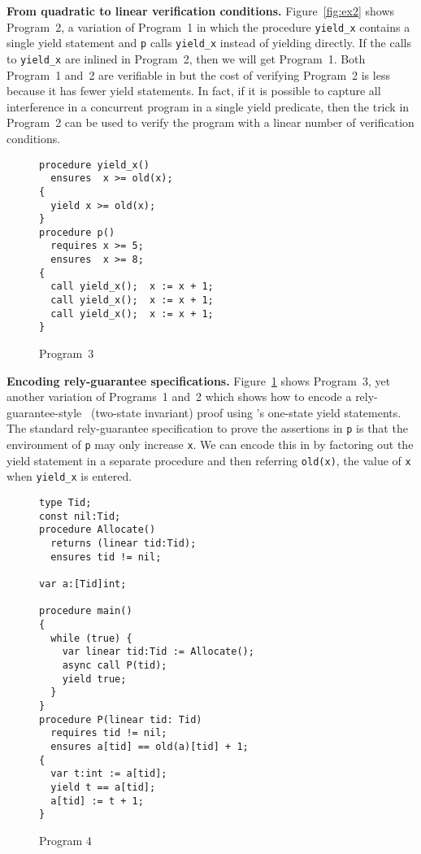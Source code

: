 {\bf From quadratic to linear verification conditions.}
Figure~\ref{fig:ex2} shows Program~2, a variation of Program~1 in which the procedure {\tt yield\_x} 
contains a single yield statement and {\tt p} calls {\tt yield\_x} instead of yielding directly.
If the calls to {\tt yield\_x} are inlined in Program~2, then we will get Program~1.
Both Program~1 and~2 are verifiable in \civl but the cost of verifying Program~2 is less because it has fewer yield statements.
In fact, if it is possible to capture all interference in a concurrent program in a single yield predicate, 
then the trick in Program~2 can be used to verify the program with a linear number of verification conditions.

\begin{figure}
\begin{verbatim}
procedure yield_x()
  ensures  x >= old(x);
{
  yield x >= old(x);
}
procedure p()
  requires x >= 5;
  ensures  x >= 8;
{
  call yield_x();  x := x + 1;
  call yield_x();  x := x + 1;
  call yield_x();  x := x + 1;
}
\end{verbatim}
\caption{Program~3}
\label{fig:ex3}
\end{figure}

{\bf Encoding rely-guarantee specifications.}
Figure~\ref{fig:ex3} shows Program~3, yet another variation of Programs~1 and~2 which shows how to encode a rely-guarantee-style~\cite{Jones83} (two-state invariant)
proof using \civl's one-state yield statements. 
The standard rely-guarantee specification to prove the assertions in {\tt p} is that the environment of {\tt p} 
may only increase {\tt x}.
We can encode this in \civl by factoring out the yield statement in a separate procedure
and then referring {\tt old(x)}, the value of {\tt x} when {\tt yield\_x} is
entered. 


\begin{figure}
\begin{verbatim}
type Tid;
const nil:Tid;
procedure Allocate() 
  returns (linear tid:Tid);
  ensures tid != nil;

var a:[Tid]int;

procedure main()
{
  while (true) {
    var linear tid:Tid := Allocate();
    async call P(tid);
    yield true;
  }
}
procedure P(linear tid: Tid)
  requires tid != nil;
  ensures a[tid] == old(a)[tid] + 1;
{
  var t:int := a[tid];
  yield t == a[tid];
  a[tid] := t + 1;
}
\end{verbatim}
\caption{Program 4}
\label{fig:ex5}
\end{figure}

